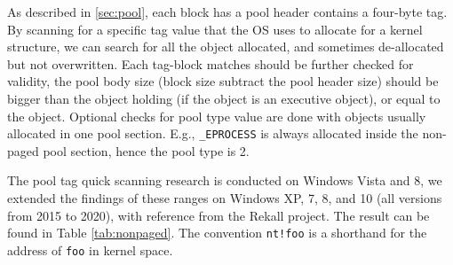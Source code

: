 As described in \ref{sec:pool}, each block has a pool header contains a
four-byte tag. By scanning for a specific tag value that the OS uses to
allocate for a kernel structure, we can search for all the object
allocated, and sometimes de-allocated but not overwritten. Each tag-block
matches should be further checked for validity, the pool body size (block size
subtract the pool header size) should be bigger than the object holding (if the
object is an executive object), or equal to the object.  Optional checks for
pool type value are done with objects usually allocated in one pool section.
E.g., \texttt{\_EPROCESS} is always allocated inside the non-paged pool section,
hence the pool type is 2.

The pool tag quick scanning research is conducted on Windows Vista and 8, we
extended the findings of these ranges on Windows XP, 7, 8, and 10 (all versions
from 2015 to 2020), with reference from the Rekall project. The result can be
found in Table \ref{tab:nonpaged}. The convention \texttt{nt!foo} is a
shorthand for the address of \texttt{foo} in kernel space.

